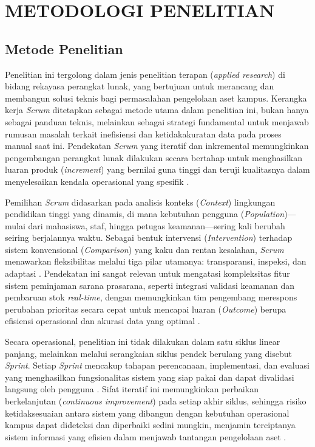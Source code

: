 \chapter{METODOLOGI PENELITIAN}
\sloppy

\section{Metode Penelitian}
Penelitian ini tergolong dalam jenis penelitian terapan (\textit{applied research}) di bidang rekayasa perangkat lunak, yang bertujuan untuk merancang dan membangun solusi teknis bagi permasalahan pengelolaan aset kampus. Kerangka kerja \textit{Scrum} ditetapkan sebagai metode utama dalam penelitian ini, bukan hanya sebagai panduan teknis, melainkan sebagai strategi fundamental untuk menjawab rumusan masalah terkait inefisiensi dan ketidakakuratan data pada proses manual saat ini. Pendekatan \textit{Scrum} yang iteratif dan inkremental memungkinkan pengembangan perangkat lunak dilakukan secara bertahap untuk menghasilkan luaran produk (\textit{increment}) yang bernilai guna tinggi dan teruji kualitasnya dalam menyelesaikan kendala operasional yang spesifik \parencite{Velasquez-Jimenez2025}.

Pemilihan \textit{Scrum} didasarkan pada analisis konteks (\textit{Context}) lingkungan pendidikan tinggi yang dinamis, di mana kebutuhan pengguna (\textit{Population})---mulai dari mahasiswa, staf, hingga petugas keamanan---sering kali berubah seiring berjalannya waktu. Sebagai bentuk intervensi (\textit{Intervention}) terhadap sistem konvensional (\textit{Comparison}) yang kaku dan rentan kesalahan, \textit{Scrum} menawarkan fleksibilitas melalui tiga pilar utamanya: transparansi, inspeksi, dan adaptasi \parencite{Schwaber2012}. Pendekatan ini sangat relevan untuk mengatasi kompleksitas fitur sistem peminjaman sarana prasarana, seperti integrasi validasi keamanan dan pembaruan stok \textit{real-time}, dengan memungkinkan tim pengembang merespons perubahan prioritas secara cepat untuk mencapai luaran (\textit{Outcome}) berupa efisiensi operasional dan akurasi data yang optimal \parencite{Putrianasari2024}.

Secara operasional, penelitian ini tidak dilakukan dalam satu siklus linear panjang, melainkan melalui serangkaian siklus pendek berulang yang disebut \textit{Sprint}. Setiap \textit{Sprint} mencakup tahapan perencanaan, implementasi, dan evaluasi yang menghasilkan fungsionalitas sistem yang siap pakai dan dapat divalidasi langsung oleh pengguna \parencite{permana2015scrum}. Sifat iteratif ini memungkinkan perbaikan berkelanjutan (\textit{continuous improvement}) pada setiap akhir siklus, sehingga risiko ketidaksesuaian antara sistem yang dibangun dengan kebutuhan operasional kampus dapat dideteksi dan diperbaiki sedini mungkin, menjamin terciptanya sistem informasi yang efisien dalam menjawab tantangan pengelolaan aset \parencite{Rifky2022}.


